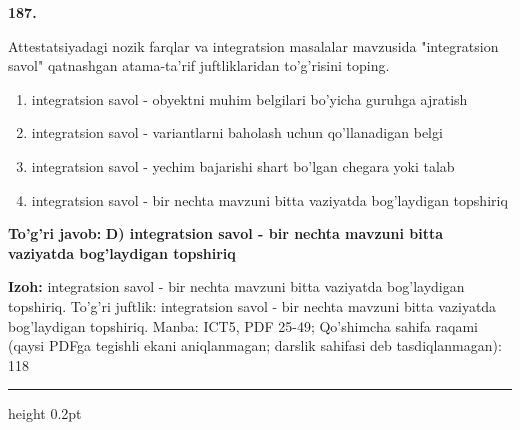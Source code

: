 \documentclass[10pt,a4paper]{article}
\begin{document}
{\bfseries\sffamily\color{ink} 187.}
\par
Attestatsiyadagi nozik farqlar va integratsion masalalar mavzusida "integratsion savol" qatnashgan atama-ta'rif juftliklaridan to'g'risini toping.
\begin{enumerate}[label=\Alph*),leftmargin=9mm]
\item integratsion savol - obyektni muhim belgilari bo'yicha guruhga ajratish
\item integratsion savol - variantlarni baholash uchun qo'llanadigan belgi
\item integratsion savol - yechim bajarishi shart bo'lgan chegara yoki talab
\item integratsion savol - bir nechta mavzuni bitta vaziyatda bog'laydigan topshiriq
\end{enumerate}
\begin{tcolorbox}[enhanced,breakable,colback=teal!4,colframe=teal!60!black,boxrule=0.45pt,arc=1.2mm,left=2.7mm,right=2.7mm,top=1.8mm,bottom=1.8mm,before skip=2mm,after skip=2mm]
{\bfseries\sffamily\color{teal}To'g'ri javob:} \textbf{D) integratsion savol - bir nechta mavzuni bitta vaziyatda bog'laydigan topshiriq}
\par\smallskip
{\bfseries Izoh:} integratsion savol - bir nechta mavzuni bitta vaziyatda bog'laydigan topshiriq. To'g'ri juftlik: integratsion savol - bir nechta mavzuni bitta vaziyatda bog'laydigan topshiriq. Manba: ICT5, PDF 25-49; Qo'shimcha sahifa raqami (qaysi PDFga tegishli ekani aniqlanmagan; darslik sahifasi deb tasdiqlanmagan): 118
\end{tcolorbox}
\vspace{2mm}\hrule height 0.2pt\vspace{3mm}
\end{document}
